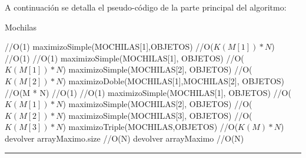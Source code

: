 A continuaci\'on se detalla el pseudo-c\'odigo de la parte principal del algoritmo:

\begin{algorithm}[H]
\caption{Mochilas}
\begin{algorithmic}[1]
 \hfill //O(1)
\state maximizoSimple(MOCHILAS[1],OBJETOS) \hfill //O($K(M[1]) \ast N$)
\endif
{} \hfill //O(1)
 \hfill //O(1)
\state maximizoSimple(MOCHILAS[1], OBJETOS) \hfill //O($K(M[1]) \ast N$)
\state maximizoSimple(MOCHILAS[2], OBJETOS) \hfill //O($K(M[2]) \ast N$)
\Else
\state maximizoDoble(MOCHILAS[1],MOCHILAS[2], OBJETOS) \hfill //O(M * N)
\endif
\endif
{} \hfill //O(1)
 \hfill //O(1)
\state maximizoSimple(MOCHILAS[1], OBJETOS) \hfill //O($K(M[1]) \ast N$)
\state maximizoSimple(MOCHILAS[2], OBJETOS) \hfill //O($K(M[2]) \ast N$)
\state maximizoSimple(MOCHILAS[3], OBJETOS) \hfill //O($K(M[3]) \ast N$)
\Else
\state maximizoTriple(MOCHILAS,OBJETOS) \hfill //O($K(M) \ast N$)
\endif
\endif
\state devolver arrayMaximo.size \hfill //O(N)
\state devolver arrayMaximo \hfill //O(N)
\EndFunction 
\end{algorithmic}
\hrule
{}
\end{algorithm}


